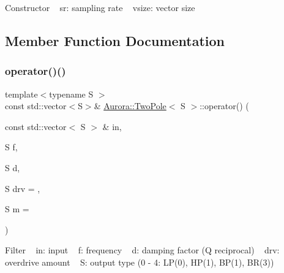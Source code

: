 Constructor ~\newline
sr\+: sampling rate ~\newline
vsize\+: vector size 

\subsection{Member Function Documentation}
\mbox{\label{class_aurora_1_1_two_pole_a7582c69b4c221f81f25c650d9c643157}} 
\subsubsection{\texorpdfstring{operator()()}{operator()()}\hspace{0.1cm}{\footnotesize\ttfamily [1/2]}}
{\footnotesize\ttfamily template$<$typename S $>$ \\
const std\+::vector$<$S$>$\& \hyperlink{class_aurora_1_1_two_pole}{Aurora\+::\+Two\+Pole}$<$ S $>$\+::operator() (\begin{DoxyParamCaption}\item[{const std\+::vector$<$ S $>$ \&}]{in,  }\item[{S}]{f,  }\item[{S}]{d,  }\item[{S}]{drv = {},  }\item[{S}]{m = {} }\end{DoxyParamCaption})\hspace{0.3cm}{\ttfamily [inline]}}

Filter ~\newline
in\+: input ~\newline
f\+: frequency ~\newline
d\+: damping factor (Q reciprocal) ~\newline
drv\+: overdrive amount ~\newline
S\+: output type (0 -\/ 4\+: L\+P(0), H\+P(1), B\+P(1), B\+R(3)) \mbox{\label{class_aurora_1_1_two_pole_a860a443654a353bb8c40927f8a45aa46}} 
